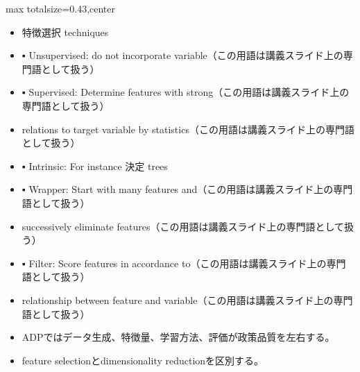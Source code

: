 \clearpage
{}
\begin{minipage}[t]{0.405\textwidth}
\begin{adjustbox}{max totalsize={\textwidth}{0.43\textheight},center}
\begin{minipage}{\textwidth}\scriptsize
{}\begin{itemize}
\item 特徴選択 techniques
\item ▪ Unsupervised: do not incorporate variable（この用語は講義スライド上の専門語として扱う）
\item ▪ Supervised: Determine features with strong（この用語は講義スライド上の専門語として扱う）
\item relations to target variable by statistics（この用語は講義スライド上の専門語として扱う）
\item ▪ Intrinsic: For instance 決定 trees
\item ▪ Wrapper: Start with many features and（この用語は講義スライド上の専門語として扱う）
\item successively eliminate features（この用語は講義スライド上の専門語として扱う）
\item ▪ Filter: Score features in accordance to（この用語は講義スライド上の専門語として扱う）
\item relationship between feature and variable（この用語は講義スライド上の専門語として扱う）
\end{itemize}\begin{itemize}
\item ADPではデータ生成、特徴量、学習方法、評価が政策品質を左右する。
\item feature selectionとdimensionality reductionを区別する。
\end{itemize}
\end{minipage}
\end{adjustbox}
\end{minipage}\hfill
